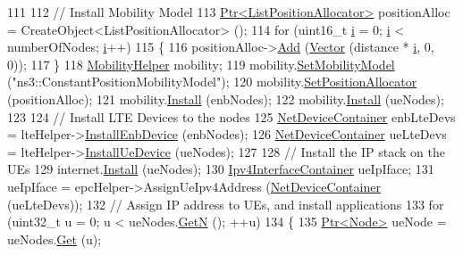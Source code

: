 \begin{DoxyCode}
111 
112   \textcolor{comment}{// Install Mobility Model}
113   \hyperlink{classns3_1_1Ptr}{Ptr<ListPositionAllocator>} positionAlloc = CreateObject<ListPositionAllocator> 
      ();
114   \textcolor{keywordflow}{for} (uint16\_t \hyperlink{bernuolliDistribution_8m_a6f6ccfcf58b31cb6412107d9d5281426}{i} = 0; \hyperlink{bernuolliDistribution_8m_a6f6ccfcf58b31cb6412107d9d5281426}{i} < numberOfNodes; \hyperlink{bernuolliDistribution_8m_a6f6ccfcf58b31cb6412107d9d5281426}{i}++)
115     \{
116       positionAlloc->\hyperlink{classns3_1_1ListPositionAllocator_a460e82f015ac012a73ba0ea0cccb3486}{Add} (\hyperlink{classns3_1_1Vector3D_a7e59b47bc94c9cb1dadff68c1d0112d8}{Vector} (distance * \hyperlink{bernuolliDistribution_8m_a6f6ccfcf58b31cb6412107d9d5281426}{i}, 0, 0));
117     \}
118   \hyperlink{classns3_1_1MobilityHelper}{MobilityHelper} mobility;
119   mobility.\hyperlink{classns3_1_1MobilityHelper_a030275011b6f40682e70534d30280aba}{SetMobilityModel} (\textcolor{stringliteral}{"ns3::ConstantPositionMobilityModel"});
120   mobility.\hyperlink{classns3_1_1MobilityHelper_ac59d5295076be3cc11021566713a28c5}{SetPositionAllocator} (positionAlloc);
121   mobility.\hyperlink{classns3_1_1MobilityHelper_a07737960ee95c0777109cf2994dd97ae}{Install} (enbNodes);
122   mobility.\hyperlink{classns3_1_1MobilityHelper_a07737960ee95c0777109cf2994dd97ae}{Install} (ueNodes);
123 
124   \textcolor{comment}{// Install LTE Devices to the nodes}
125   \hyperlink{classns3_1_1NetDeviceContainer}{NetDeviceContainer} enbLteDevs = lteHelper->\hyperlink{classns3_1_1LteHelper_a5e009ad35ef85f46b5a6099263f15a03}{InstallEnbDevice} (enbNodes);
126   \hyperlink{classns3_1_1NetDeviceContainer}{NetDeviceContainer} ueLteDevs = lteHelper->\hyperlink{classns3_1_1LteHelper_ac9cd932d7de92811cfa953c2e3b2fc9f}{InstallUeDevice} (ueNodes);
127 
128   \textcolor{comment}{// Install the IP stack on the UEs}
129   internet.\hyperlink{classns3_1_1InternetStackHelper_a6645b412f31283d2d9bc3d8a95cebbc0}{Install} (ueNodes);
130   \hyperlink{classns3_1_1Ipv4InterfaceContainer}{Ipv4InterfaceContainer} ueIpIface;
131   ueIpIface = epcHelper->AssignUeIpv4Address (\hyperlink{classns3_1_1NetDeviceContainer}{NetDeviceContainer} (ueLteDevs));
132   \textcolor{comment}{// Assign IP address to UEs, and install applications}
133   \textcolor{keywordflow}{for} (uint32\_t u = 0; u < ueNodes.\hyperlink{classns3_1_1NodeContainer_aed647ac56d0407a7706aba02eb44b951}{GetN} (); ++u)
134     \{
135       \hyperlink{classns3_1_1Ptr}{Ptr<Node>} ueNode = ueNodes.\hyperlink{classns3_1_1NodeContainer_a9ed96e2ecc22e0f5a3d4842eb9bf90bf}{Get} (u);

\end{DoxyCode}
